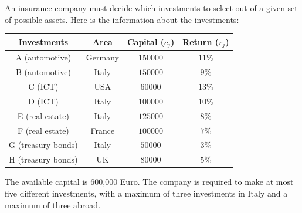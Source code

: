\documentclass[12pt, a4paper]{report}
\begin{document}
    \begin{example}
        An insurance company must decide which investments to select out of a given set of possible assets.
        Here is the information about the investments:
        \begin{table}[H]
            \centering
            \begin{tabular}{|c|ccc|}
            \hline
            \textbf{Investments} & \textbf{Area} & \textbf{Capital ($c_j$)} & \textbf{Return ($r_j$)} \\ \hline
            A (automotive)       & Germany       & $150 000$                & $11\%$                  \\
            B (automotive)       & Italy         & $150 000$                & $9\%$                   \\
            C (ICT)              & USA           & $60 000$                 & $13\%$                  \\
            D (ICT)              & Italy         & $100 000$                & $10\%$                  \\
            E (real estate)      & Italy         & $125 000$                & $8\%$                   \\
            F (real estate)      & France        & $100 000$                & $7\%$                   \\
            G (treasury bonds)   & Italy         & $50 000$                 & $3\%$                   \\
            H (treasury bonds)   & UK            & $80 000$                 & $5\%$                   \\ \hline
            \end{tabular}
        \end{table}
        The available capital is 600,000 Euro.
        The company is required to make at most five different investments, with a maximum of three investments in Italy and a maximum of three abroad.


\end{example}
\end{document}
